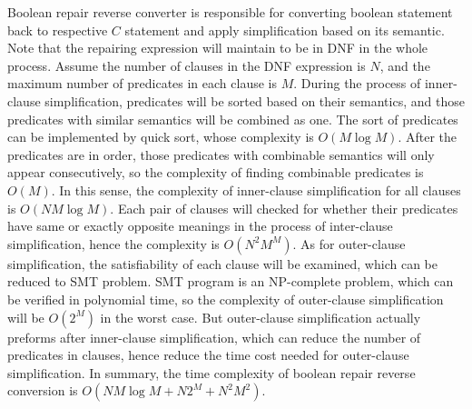 \documentclass[10pt,journal,final,]{article}
\theoremstyle{definition}
\begin{document}
Boolean repair reverse converter is responsible for converting boolean statement back to respective $C$ statement and apply simplification based on its semantic.
Note that the repairing expression will maintain to be in DNF in the whole process.
Assume the number of clauses in the DNF expression is $N$, and the maximum number of predicates in each clause is $M$.
During the process of inner-clause simplification, predicates will be sorted based on their semantics, and those predicates with similar semantics will be combined as one.
The sort of predicates can be implemented by quick sort, whose complexity is $O(M\log{M})$. After the predicates are in order, those predicates with combinable semantics will only appear consecutively,
so the complexity of finding combinable predicates is $O(M)$.
In this sense, the complexity of inner-clause simplification for all clauses is $O(NM\log{M})$.
Each pair of clauses will checked for whether their predicates have same or exactly opposite meanings in the process of inter-clause simplification, hence the complexity is $O(N^{2}M^{M})$.
As for outer-clause simplification, the satisfiability of each clause will be examined, which can be reduced to SMT problem.
SMT program is an NP-complete problem, which can be verified in polynomial time, so the complexity of outer-clause simplification will be $O(2^{M})$ in the worst case.
But outer-clause simplification actually preforms after inner-clause simplification, which can reduce the number of predicates in clauses, hence reduce the time cost needed for outer-clause simplification.
In summary, the time complexity of boolean repair reverse conversion is $O(NM\log{M} + N2^{M} + N^{2}M^{2})$.
\end{document}
